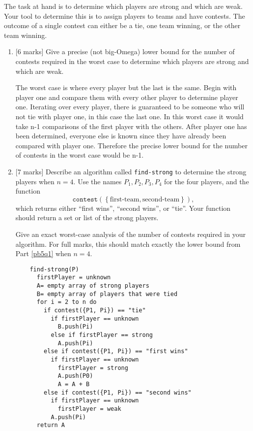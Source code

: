 \documentclass[12pt]{article}
\begin{document}
The task at hand is to determine which players are strong and which are weak.
Your tool to determine this is to assign players to teams and have contests.
The outcome of a single contest can either be a tie, one team winning, or the
other team winning.
\begin{enumerate}
  \item \label{pb5q1}[6 marks] Give a precise (not big-Omega) lower bound for
  the number of contests required in the worst case to determine which players
  are strong and which are weak.

  The worst case is where every player but the last is the same. Begin with player one and compare them with every other player to determine player one. Iterating over every player, there is guaranteed to be someone who will not tie with player one, in this case the last one. In this worst case it would take n-1 comparisons of the first player with the others. After player one has been determined, everyone else is known since they have already been compared with player one. Therefore the precise lower bound for the number of contests in the worst case would be n-1.
  
  \item \label{pb5q2}[7 marks] Describe an algorithm called
  \texttt{find-strong} to determine the strong players when $n = 4$. Use the
  names $P_1, P_2, P_3, P_4$ for the four players, and the function
  \[ \texttt{contest} \left( \left\{ \textrm{first-team}, \textrm{second-team}
     \right\} \right), \]
  which returns either ``first wins'', ``second wins'', or ``tie''. Your
  function should return a set or list of the strong players.
  
  Give an exact worst-case analysis of the number of contests required in your
  algorithm. For full marks, this should match exactly the lower bound from
  Part \ref{pb5q1} when $n = 4$.

  \begin{verbatim}
    find-strong(P)
      firstPlayer = unknown
      A= empty array of strong players
      B= empty array of players that were tied
      for i = 2 to n do
        if contest({P1, Pi}) == "tie"
          if firstPlayer == unknown
            B.push(Pi)
          else if firstPlayer == strong
            A.push(Pi)
        else if contest({P1, Pi}) == "first wins"
          if firstPlayer == unknown
            firstPlayer = strong
            A.push(P0)
            A = A + B
        else if contest({P1, Pi}) == "second wins"
          if firstPlayer == unknown
            firstPlayer = weak
          A.push(Pi)
      return A
  \end{verbatim}


\end{enumerate}
\end{document}
